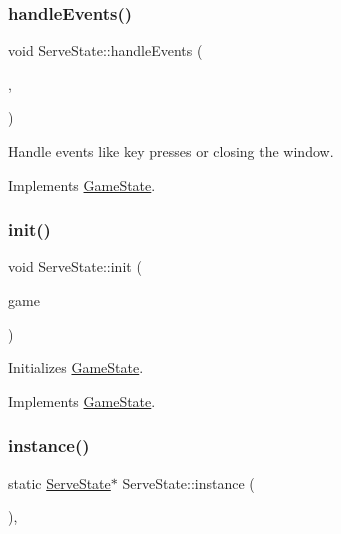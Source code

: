 \subsubsection{\texorpdfstring{handleEvents()}{handleEvents()}}
{\footnotesize\ttfamily void Serve\+State\+::handle\+Events (\begin{DoxyParamCaption}\item[{\mbox{\hyperlink{class_game_engine}{Game\+Engine}} $\ast$}]{,  }\item[{sf\+::\+Event}]{ }\end{DoxyParamCaption})\hspace{0.3cm}{\ttfamily [virtual]}}



Handle events like key presses or closing the window. 



Implements \mbox{\hyperlink{class_game_state_a3ef0638514dbfe71581d593cf0f66ce5}{Game\+State}}.

\mbox{\label{class_serve_state_ab39cdbf8c6fe8bbcf67d29033c3e2c15}} 
\subsubsection{\texorpdfstring{init()}{init()}}
{\footnotesize\ttfamily void Serve\+State\+::init (\begin{DoxyParamCaption}\item[{\mbox{\hyperlink{class_game_engine}{Game\+Engine}} $\ast$}]{game }\end{DoxyParamCaption})\hspace{0.3cm}{\ttfamily [virtual]}}



Initializes \mbox{\hyperlink{class_game_state}{Game\+State}}. 



Implements \mbox{\hyperlink{class_game_state_a10b6e6bb31591c70d08ffcee5f29fa81}{Game\+State}}.

\mbox{\label{class_serve_state_ac0f3ead67813e13e2a84026162da3b7c}} 
\subsubsection{\texorpdfstring{instance()}{instance()}}
{\footnotesize\ttfamily static \mbox{\hyperlink{class_serve_state}{Serve\+State}}$\ast$ Serve\+State\+::instance (\begin{DoxyParamCaption}{ }\end{DoxyParamCaption})\hspace{0.3cm}{\ttfamily [inline]}, {\ttfamily [static]}}

